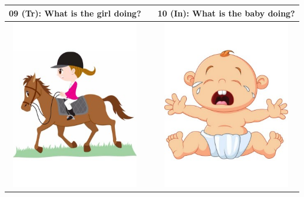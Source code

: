 \begin{tabular}{|c|c|c|}
\hline
09 (Tr): What is the girl doing? && 10 (In): What is the baby doing? \\
\hline
\includegraphics[width=15em,trim=0 0 0 -3]{figures/I09.jpg} & & \includegraphics[width=15em,trim=0 0 0 -3]{figures/I10.jpg} \\
\hline
\end{tabular}
\vspace{1em} \\


